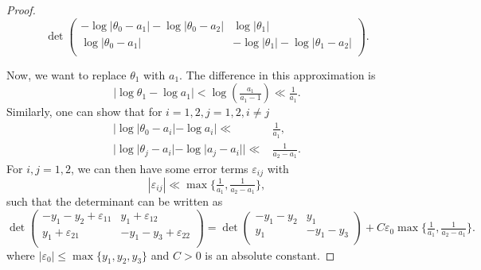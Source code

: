 \documentclass[11pt,letterpaper]{amsart}
\theoremstyle{definition}
\theoremstyle{remark}
\begin{document}
\begin{proof}
		\begin{equation}
			\det\left(
			\begin{matrix}
				- \log|\theta_0 -a_1 | - \log|\theta_0-a_2| & \log |\theta_1| \\
				\log|\theta_0 - a_1 | & - \log |\theta_1| - \log |\theta_1 - a_2|  \\
			\end{matrix}
			\right).
		\end{equation}
		
		Now, we want to replace $\theta_1$ with $a_1$. The difference in this approximation is 
		\begin{equation}
			| \log\theta_1 - \log a_1 |  <  \log\left( \tfrac{a_1}{a_1 - 1} \right) \ll \tfrac{1}{a_1}.
		\end{equation}
		Similarly, one can show that for $i=1,2, j =1,2, i \neq j$
		\begin{align}
			|\log | \theta_0 - a_i | - \log a_i| \ll & \tfrac{1}{a_1} ,\\
			|\log | \theta_j - a_i | - \log |a_j- a_i|| \ll & \tfrac{1}{a_2-a_1}.
		\end{align}
		For $i,j = 1,2$, we can then have some error terms $\varepsilon_{ij}$ with
		\begin{equation}
			|\varepsilon_{ij}| \ll  \max\{\tfrac{1}{a_1}, \tfrac{1}{a_2-a_1} \},
		\end{equation}
		such that the determinant can be written as
		\begin{equation}
			\det\left(
			\begin{smallmatrix}
				- y_1 - y_2 + \varepsilon_{11} & y_1 + \varepsilon_{12} \\
				y_1 + \varepsilon_{21} & - y_1 - y_3  + \varepsilon_{22} \\ 
			\end{smallmatrix}
			\right)
			=  
			\det\left(
			\begin{smallmatrix}
				- y_1 - y_2 & y_1  \\
				y_1   & - y_1 - y_3    \\
			\end{smallmatrix} 
			\right) 
			+ C \varepsilon_{0} \max\{\tfrac{1}{a_1}, \tfrac{1}{a_2-a_1}\}
			.
		\end{equation}
		where $|\varepsilon_0 | \leq  \max\{y_1,y_2,y_3\}$ and $C>0$ is an absolute constant.
	\end{proof}
	
\end{document}
